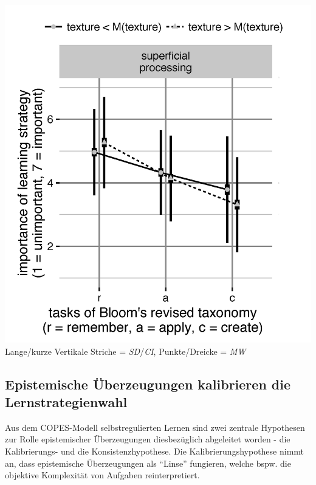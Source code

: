 \documentclass[]{tufte-handout}
\begin{document}
\begin{marginfigure}
\includegraphics{../Img/Kalibrierung_sup4.png} Lange/kurze Vertikale
Striche = \emph{SD}/\emph{CI}, Punkte/Dreicke = \emph{MW}
\end{marginfigure}

\subsection{Epistemische Überzeugungen kalibrieren die
Lernstrategienwahl}\label{epistemische-uberzeugungen-kalibrieren-die-lernstrategienwahl}

Aus dem COPES-Modell selbstregulierten Lernen sind zwei zentrale
Hypothesen zur Rolle epistemischer Überzeugungen diesbezüglich
abgeleitet worden - die Kalibrierungs- und die Konsistenzhypothese. Die
Kalibrierungshypothese nimmt an, dass epistemische Überzeugungen als
``Linse'' fungieren, welche bspw. die objektive Komplexität von Aufgaben
reinterpretiert.
\end{document}

